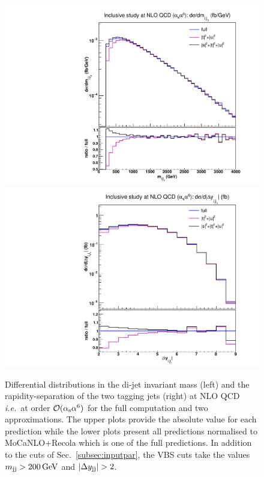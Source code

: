 \begin{figure}[hbt]
\centering
{\includegraphics[scale=0.35]{figures/scanfigures/mjj_nlo.pdf}}
{\includegraphics[scale=0.35]{figures/scanfigures/dyjj_nlo.pdf}}
\caption{
Differential distributions in the di-jet invariant mass (left) and the rapidity-separation of the two tagging jets (right) at NLO QCD \emph{i.e.}\ at order $\mathcal{O}(\alpha_\text{s}\alpha^6)$ for the full computation and two approximations.
The upper plots provide the absolute value for each prediction while the lower plots present all predictions normalised to {\sc MoCaNLO}+{\sc Recola} which is one of the full predictions.
In addition to the cuts of Sec.~\ref{subsec:inputpar}, the VBS cuts take the values $m_{\text{j}\text{j}}>200 \,\text{GeV}$ and $|\Delta y_{\Pj\Pj}|>2$.} 
\label{fig:mjjdyjj_1d_1}
\end{figure}


